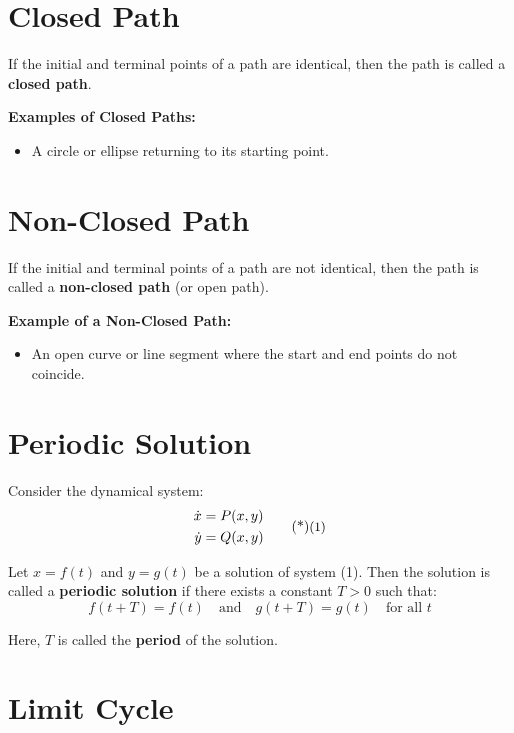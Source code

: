 \section*{Closed Path}

If the initial and terminal points of a path are identical, then the path is called a \textbf{closed path}.

\vspace{0.5em}
\noindent \textbf{Examples of Closed Paths:}
\begin{itemize}
    \item A circle or ellipse returning to its starting point.
\end{itemize}

\section*{ Non-Closed Path}

If the initial and terminal points of a path are not identical, then the path is called a \textbf{non-closed path} (or open path).

\vspace{0.5em}
\noindent \textbf{Example of a Non-Closed Path:}
\begin{itemize}
    \item An open curve or line segment where the start and end points do not coincide.
\end{itemize}
\section*{Periodic Solution}

Consider the dynamical system:
\begin{equation}
    \begin{aligned}
        \dot{x} &= P(x, y) \\
        \dot{y} &= Q(x, y)
    \end{aligned} \sidenote{1}
\end{equation}

\noindent Let $x = f(t)$ and $y = g(t)$ be a solution of system (1). Then the solution is called a \textbf{periodic solution} if there exists a constant $T > 0$ such that:
\[
f(t + T) = f(t) \quad \text{and} \quad g(t + T) = g(t) \quad \text{for all } t
\]

\noindent Here, $T$ is called the \textbf{period} of the solution.
\section*{Limit Cycle}

